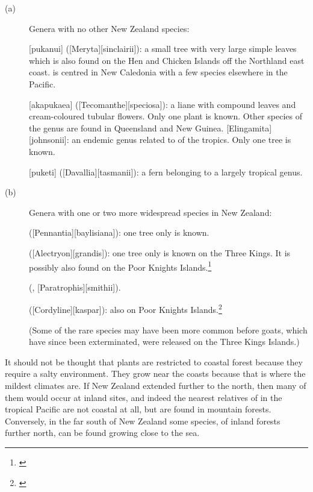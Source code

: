 \begin{description}
	\item[{(a)}]Genera with no other New Zealand species:

	[pukanui] ([Meryta][sinclairii]): a small tree with very large simple leaves which is also found on the Hen and Chicken Islands off the Northland east coast.
 is centred in New Caledonia with a few species elsewhere in the Pacific.

	[akapukaea] ([Tecomanthe][speciosa]): a liane with compound leaves and cream-coloured tubular flowers.
	Only one plant is known.
	Other species of the genus are found in Queensland and New Guinea.
[Elingamita][johnsonii]: an endemic genus related to  of the tropics.
	Only one tree is known.

	[puketi] ([Davallia][tasmanii]): a fern belonging to a largely tropical genus.
	
	\item[{(b)}]Genera with one or two more widespread species in New Zealand:

	 ([Pennantia][baylisiana]): one tree only is known.

	 ([Alectryon][grandis]): one tree only is known on the Three Kings.
	It is possibly also found on the Poor Knights Islands.\footnote{\cite{wright1983conservation}}

	 (, [Paratrophis][smithii]).

	 ([Cordyline][kaspar]): also on Poor Knights Islands.\footnote{\cite{wright1983conservation}}

	(Some of the rare species may have been more common before goats, which have since been exterminated, were released on the Three Kings Islands.)
\end{description}

It should not be thought that plants are restricted to coastal forest because they require a salty environment.
They grow near the coasts because that is where the mildest climates are.
If New Zealand extended further to the north, then many of them would occur at inland sites, and indeed the nearest relatives of  in the tropical Pacific are not coastal at all, but are found in mountain forests.
Conversely, in the far south of New Zealand some species, of inland forests further north, can be found growing close to the sea.

